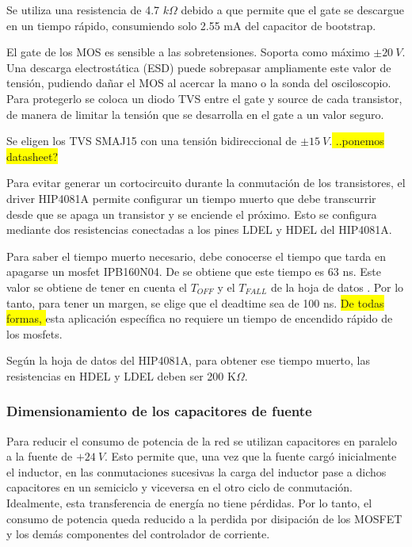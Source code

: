 \noindent Se utiliza una resistencia de 4.7 $k\Omega$ debido a que permite que el gate se descargue en un tiempo rápido, consumiendo solo 2.55 mA del capacitor de bootstrap.


\noindent El gate de los MOS es sensible a las sobretensiones. Soporta como máximo $\pm 20\:V$. Una descarga electrostática (ESD) puede sobrepasar ampliamente este valor de tensión, pudiendo dañar el MOS al acercar la mano o la sonda del osciloscopio. Para protegerlo se coloca un diodo TVS entre el gate y source de cada transistor, de manera de limitar la tensión que se desarrolla en el gate a un valor seguro.

\noindent Se eligen los TVS SMAJ15 con una tensión bidireccional de $\pm 15\:V$.\colorbox{yellow}{ ..ponemos datasheet?}


\noindent Para evitar generar un cortocircuito durante la conmutación de los transistores, el driver HIP4081A permite configurar un tiempo muerto que debe transcurrir desde que se apaga un transistor y se enciende el próximo. Esto se configura mediante dos resistencias conectadas a los pines LDEL y HDEL del HIP4081A.

\noindent Para saber el tiempo muerto necesario, debe conocerse el tiempo que tarda en apagarse un mosfet IPB160N04. De \cite{IPB160N04} se obtiene que este tiempo es 63 ns. Este valor se obtiene de tener en cuenta el $T_{OFF}$ y el $T_{FALL}$ de la hoja de datos . Por lo tanto, para tener un margen, se elige que el deadtime sea de 100 ns. \colorbox{yellow}{De todas formas, } esta aplicación específica no requiere un tiempo de encendido rápido de los mosfets.

\noindent Según la hoja de datos del HIP4081A, para obtener ese tiempo muerto, las resistencias en HDEL y LDEL deben ser 200 K$\Omega$.

\subsubsection{Dimensionamiento de los capacitores de fuente}
	
\noindent Para reducir el consumo de potencia de la red se utilizan capacitores en paralelo a la fuente de $+24\:V$. Esto permite que, una vez que la fuente cargó inicialmente el inductor, en las conmutaciones sucesivas la carga del inductor pase a dichos capacitores en un semiciclo y viceversa en el otro ciclo de conmutación. Idealmente, esta transferencia de energía no tiene pérdidas. Por lo tanto, el consumo de potencia queda reducido a la perdida por disipación de los MOSFET y los demás componentes del controlador de corriente. 

